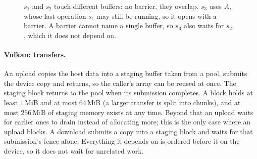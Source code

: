 \documentclass[main.tex]{subfiles}
\begin{document}
    \begin{figure}[ht]
        \centering
        \caption{$s_1$ and $s_2$ touch different buffers: no barrier, they overlap. $s_3$ uses $A$, whose last operation $s_1$ may still be running, so it opens with a barrier. A barrier cannot name a single buffer, so $s_3$ also waits for $s_2$, which it does not depend on.}
        \label{fig:gpu-barrier}
    \end{figure}

    \paragraph{Vulkan: transfers.}
    An upload copies the host data into a staging buffer taken from a pool, submits the device copy and returns, so the caller's array can be reused at once. The staging block returns to the pool when its submission completes. A block holds at least $1\,\mathrm{MiB}$ and at most $64\,\mathrm{MiB}$ (a larger transfer is split into chunks), and at most $256\,\mathrm{MiB}$ of staging memory exists at any time. Beyond that an upload waits for earlier ones to drain instead of allocating more; this is the only case where an upload blocks. A download submits a copy into a staging block and waits for that submission's fence alone. Everything it depends on is ordered before it on the device, so it does not wait for unrelated work.
\end{document}

